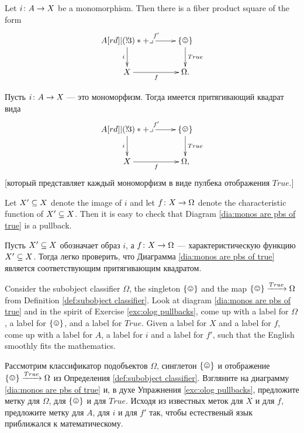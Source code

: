 \documentclass[CT4S-EN-RU]{subfiles}
\begin{document}
\begin{corollaryENG}\label{cor:monos are pullbacks of true}
Let $i\taking A\to X$ be a monomorphism. Then there is a fiber product square of the form 
\begin{align}\label{dia:monos are pbs of true}
\xymatrix{A\ar[r]^{f'}\ar[d]_i\ullimit&\singleton\ar[d]^{True}\\X\ar[r]_f&\Omega.}
\end{align}
\end{corollaryENG}

\begin{corollaryRUS}\label{cor:monos are pullbacks of true}
Пусть $i\taking A\to X$ — это мономорфизм. Тогда имеется притягивающий квадрат вида 
\begin{align}\label{dia:monos are pbs of true}
\xymatrix{A\ar[r]^{f'}\ar[d]_i\ullimit&\singleton\ar[d]^{True}\\X\ar[r]_f&\Omega,}
\end{align}
[который представляет каждый мономорфизм в виде пулбека отображения $True$.]
\end{corollaryRUS}

\begin{proofENG}
Let $X'\ss X$ denote the image of $i$ and let $f\taking X\to\Omega$ denote the characteristic function of $X'\ss X$. Then it is easy to check that Diagram \ref{dia:monos are pbs of true} is a pullback.
\end{proofENG}

\begin{proofRUS}
Пусть $X'\ss X$ обозначает образ $i$, а $f\taking X\to\Omega$ — характеристическую функцию $X'\ss X$. Тогда легко проверить, что Диаграмма \ref{dia:monos are pbs of true} является соответствующим притягивающим квадратом.
\end{proofRUS}

\begin{exerciseENG}
Consider the subobject classifier $\Omega$, the singleton $\singleton$ and the map $\singleton\To{True}\Omega$ from Definition \ref{def:subobject classifier}. Look at diagram \ref{dia:monos are pbs of true} and in the spirit of Exercise \ref{exc:olog pullbacks}, come up with a label for $\Omega$, a label for $\singleton$, and a label for $True$. Given a label for $X$ and a label for $f$, come up with a label for $A$, a label for $i$ and a label for $f'$, such that the English smoothly fits the mathematics.
\end{exerciseENG}

\begin{exerciseRUS}
Рассмотрим классификатор подобъектов $\Omega$, синглетон $\singleton$ и отображение $\singleton\To{True}\Omega$ из Определения \ref{def:subobject classifier}. Взгляните на диаграмму \ref{dia:monos are pbs of true} и, в духе Упражнения \ref{exc:olog pullbacks}, предложите метку для $\Omega$, для $\singleton$ и для $True$. Исходя из известных меток для $X$ и для $f$, предложите метку для $A$, для $i$ и для $f'$ так, чтобы естественый язык приближался к математическому.%
\end{exerciseRUS}
\end{document}
